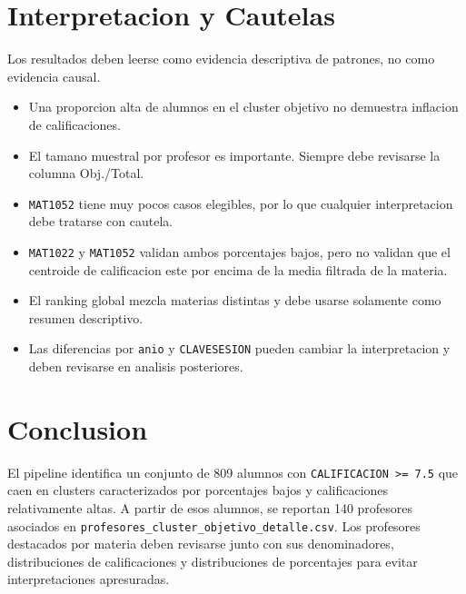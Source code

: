 \documentclass[11pt,letterpaper]{article}
\newcommand{\code}[1]{\texttt{#1}}
\begin{document}
\section{Interpretacion y Cautelas}

Los resultados deben leerse como evidencia descriptiva de patrones, no como evidencia causal.

\begin{itemize}
    \item Una proporcion alta de alumnos en el cluster objetivo no demuestra inflacion de calificaciones.
    \item El tamano muestral por profesor es importante. Siempre debe revisarse la columna Obj./Total.
    \item \code{MAT1052} tiene muy pocos casos elegibles, por lo que cualquier interpretacion debe tratarse con cautela.
    \item \code{MAT1022} y \code{MAT1052} validan ambos porcentajes bajos, pero no validan que el centroide de calificacion este por encima de la media filtrada de la materia.
    \item El ranking global mezcla materias distintas y debe usarse solamente como resumen descriptivo.
    \item Las diferencias por \code{anio} y \code{CLAVESESION} pueden cambiar la interpretacion y deben revisarse en analisis posteriores.
\end{itemize}

\section{Conclusion}

El pipeline identifica un conjunto de 809 alumnos con \code{CALIFICACION >= 7.5} que caen en clusters caracterizados por porcentajes bajos y calificaciones relativamente altas. A partir de esos alumnos, se reportan 140 profesores asociados en \code{profesores\_cluster\_objetivo\_detalle.csv}. Los profesores destacados por materia deben revisarse junto con sus denominadores, distribuciones de calificaciones y distribuciones de porcentajes para evitar interpretaciones apresuradas.

\end{document}
